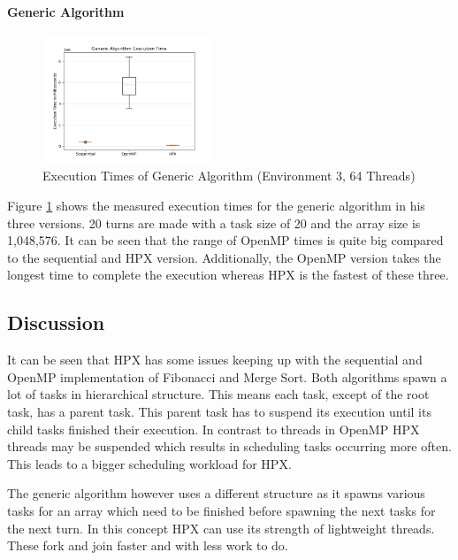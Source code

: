 \paragraph{Generic Algorithm}
  \begin{figure}[htbp]
	\centering
	\includegraphics[width=0.45\textwidth]{figures/generic_NoOp.png}
	\caption{Execution Times of Generic Algorithm (Environment 3, 64 Threads)}
	\label{fig:gen_NoOp}
\end{figure}
Figure \ref{fig:gen_NoOp} shows the measured execution times for the generic algorithm in his three versions.
20 turns are made with a task size of 20 and the array size is 1,048,576.
It can be seen that the range of OpenMP times is quite big compared to the sequential and HPX version.
Additionally, the OpenMP version takes the longest time to complete the execution whereas HPX is the fastest of these three. 

\subsection{Discussion}
It can be seen that HPX has some issues keeping up with the sequential and OpenMP implementation of Fibonacci and Merge Sort.
Both algorithms spawn a lot of tasks in hierarchical structure.
This means each task, except of the root task, has a parent task.
This parent task has to suspend its execution until its child tasks finished their execution.
In contrast to threads in OpenMP HPX threads may be suspended which results in scheduling tasks occurring more often.
This leads to a bigger scheduling workload for HPX.

The generic algorithm however uses a different structure as it spawns various tasks for an array which need to be finished before spawning the next tasks for the next turn.
In this concept HPX can use its strength of lightweight threads.
These fork and join faster and with less work to do.

